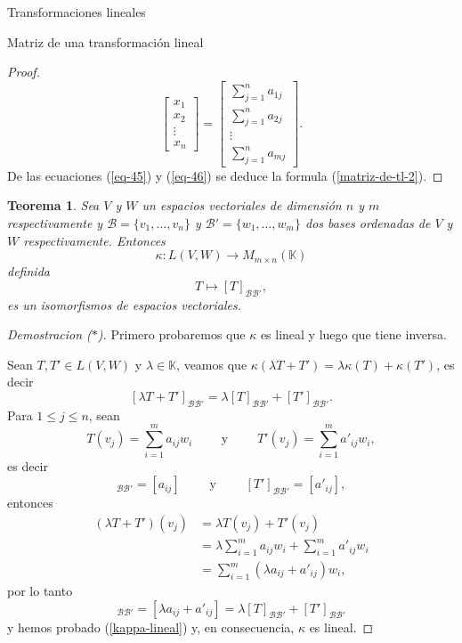 \documentclass[a4paper,12pt,twoside,spanish]{amsbook}
\newtheorem{teorema}{Teorema}[section]
\theoremstyle{definition}
\theoremstyle{remark}
\newcommand{\K}{\mathbb K}
\begin{document}
\begin{chapter}{Transformaciones lineales}
\begin{section}{Matriz de una transformación lineal}
\begin{proof}
\begin{equation}
			\begin{bmatrix} x_1\\x_2\\ \vdots\\x_n\end{bmatrix}
			=
			\begin{bmatrix}  \sum_{j=1}^{n}a_{1j}\\\sum_{j=1}^{n}a_{2j}\\ \vdots\\\sum_{j=1}^{n}a_{mj}\end{bmatrix}.
			\end{equation}
			De las ecuaciones (\ref{eq-45}) y (\ref{eq-46}) se deduce la formula (\ref{matriz-de-tl-2}).
		\end{proof}
		
		\begin{teorema}
			Sea $V$  y $W$ un espacios vectoriales de dimensión $n$ y $m$ respectivamente y $\mathcal B = \{v_1,\ldots,v_n\}$ y $\mathcal B' = \{w_1,\ldots,w_m\}$ dos bases  ordenadas de $V$ y $W$ respectivamente. Entonces 
			$$
			\kappa: L(V,W) \to M_{m \times n}(\K)
			$$
			definida
			$$
			T \mapsto [T]_{\mathcal B \mathcal B'},
			$$
			es un isomorfismos de espacios vectoriales. 
		\end{teorema}
		\begin{proof}[Demostracion ($*$)]
			Primero probaremos que $\kappa$  es lineal y luego que tiene inversa.
			
			Sean $T,T' \in L(V,W)$ y $\lambda \in \K$, veamos que $\kappa(\lambda T+ T') = \lambda \kappa(T)+ \kappa(T')$,  es decir
			\begin{equation}\label{kappa-lineal}
				[\lambda T+ T']_{\mathcal B \mathcal B'} = \lambda[T]_{\mathcal B \mathcal B'}+ [T']_{\mathcal B \mathcal B'}.
			\end{equation}
			Para $1 \le j \le n$, sean 
			\begin{equation*}
				T(v_j) = \sum_{i=1}^m a_{ij} w_i\qquad \text{ y } \qquad T'(v_j) = \sum_{i=1}^m a'_{ij} w_i,
			\end{equation*}
			es  decir
			\begin{equation*}
			[T]_{\mathcal B \mathcal B'} =	[a_{ij}] \qquad\text{ y } \qquad [T']_{\mathcal B \mathcal B'} =	[a'_{ij}],
			\end{equation*}
			entonces
			\begin{align*}
				(\lambda T+ T')(v_j) &= \lambda T(v_j)+ T'(v_j) \\
				&=\lambda \sum_{i=1}^m a_{ij} w_i+ \sum_{i=1}^m a'_{ij} w_i \\
				&= \sum_{i=1}^m (\lambda a_{ij}+ a'_{ij}) w_i,
			\end{align*}
			por lo tanto
			\begin{equation*}
				[\lambda T+ T']_{\mathcal B \mathcal B'} = [\lambda a_{ij}+ a'_{ij}] =
				\lambda[T]_{\mathcal B \mathcal B'}+ [T']_{\mathcal B \mathcal B'}
			\end{equation*}
			y hemos probado (\ref{kappa-lineal}) y, en consecuencia, $\kappa$  es lineal.
			

\end{proof}
\end{section}
\end{chapter}
\end{document}
